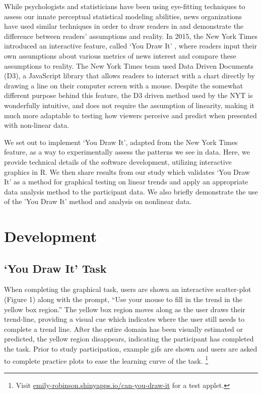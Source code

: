 \documentclass[10pt]{article}
\begin{document}
{\textcolor{RedOrange}{While psychologists and statisticians have been using eye-fitting techniques to assess our innate perceptual statistical modeling abilities, news organizations have used similar techniques in order to draw readers in and demonstrate the difference between readers' assumptions and reality.}}
In 2015, the New York Times introduced an interactive feature, called
`You Draw It' \cite{aisch2015you}, where readers input their own
assumptions about various
{\textcolor{RedOrange}{metrics of news interest}} and compare these
assumptions to reality. The New York Times team used Data Driven
Documents (D3), {\textcolor{RedOrange}{a JavaScript library}} that
allows readers to
{\textcolor{RedOrange}{interact with a chart directly by}} drawing a
line on their computer screen with a mouse.
{\textcolor{RedOrange}{Despite the somewhat different purpose behind this feature, the D3 driven method used by the NYT is wonderfully intuitive, and does not require the assumption of linearity, making it much more adaptable to testing how viewers perceive and predict when presented with non-linear data.}}

{\textcolor{RedOrange}{We set out to implement}} `You Draw It', adapted
from the New York Times feature, as a way to experimentally assess the
patterns we see in data. Here, we provide technical details of the
software development, utilizing interactive graphics in
R\cite{r-software}. We then share results from our study which validates
`You Draw It' as a method for graphical testing
{\textcolor{RedOrange}{on linear trends}} and apply an appropriate data
analysis method to the participant data.
{\textcolor{RedOrange}{We also briefly demonstrate the use of the 'You Draw It' method and analysis on nonlinear data.}}

\section{Development}

\subsection{`You Draw It' Task}

When completing the graphical task, users are shown an interactive
scatter-plot (Figure 1) along with the prompt, ``Use your mouse to fill
in the trend in the yellow box region.'' The yellow box region moves
along as the user draws their trend-line, providing a visual cue which
indicates where the user still needs to complete a trend line. After the
entire domain has been visually estimated or predicted, the yellow
region disappears, indicating the participant has completed the task.
Prior to study participation, example gifs are shown and users are asked
to complete practice plots to ease the learning curve of the task.
\footnote{Visit \url{emily-robinson.shinyapps.io/can-you-draw-it} for a
  test applet.}
\end{document}
